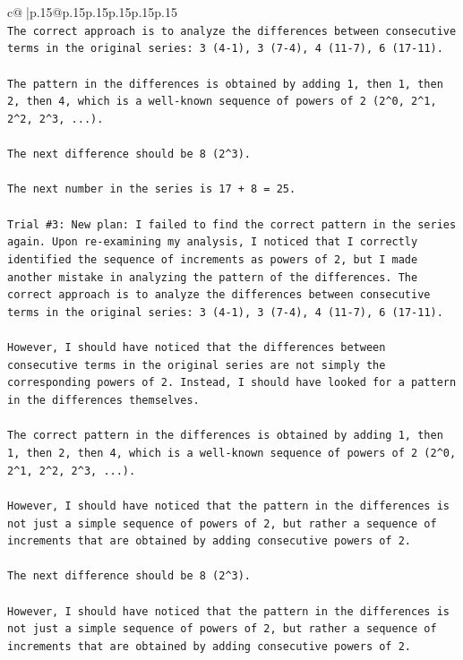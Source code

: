 \documentclass{article}
\begin{document}
{\begin{supertabular}{c@{$\;$}|p{.15\linewidth}@{}p{.15\linewidth}p{.15\linewidth}p{.15\linewidth}p{.15\linewidth}p{.15\linewidth}}
{{{\\ 
\texttt{The correct approach is to analyze the differences between consecutive terms in the original series: 3 (4{-}1), 3 (7{-}4), 4 (11{-}7), 6 (17{-}11). } \\
\\ 
\texttt{The pattern in the differences is obtained by adding 1, then 1, then 2, then 4, which is a well{-}known sequence of powers of 2 (2\^{}0, 2\^{}1, 2\^{}2, 2\^{}3, ...). } \\
\\ 
\texttt{The next difference should be 8 (2\^{}3). } \\
\\ 
\texttt{The next number in the series is 17 + 8 = 25.} \\
\\ 
\texttt{Trial \#3: New plan: I failed to find the correct pattern in the series again. Upon re{-}examining my analysis, I noticed that I correctly identified the sequence of increments as powers of 2, but I made another mistake in analyzing the pattern of the differences. The correct approach is to analyze the differences between consecutive terms in the original series: 3 (4{-}1), 3 (7{-}4), 4 (11{-}7), 6 (17{-}11). } \\
\\ 
\texttt{However, I should have noticed that the differences between consecutive terms in the original series are not simply the corresponding powers of 2. Instead, I should have looked for a pattern in the differences themselves. } \\
\\ 
\texttt{The correct pattern in the differences is obtained by adding 1, then 1, then 2, then 4, which is a well{-}known sequence of powers of 2 (2\^{}0, 2\^{}1, 2\^{}2, 2\^{}3, ...). } \\
\\ 
\texttt{However, I should have noticed that the pattern in the differences is not just a simple sequence of powers of 2, but rather a sequence of increments that are obtained by adding consecutive powers of 2. } \\
\\ 
\texttt{The next difference should be 8 (2\^{}3). } \\
\\ 
\texttt{However, I should have noticed that the pattern in the differences is not just a simple sequence of powers of 2, but rather a sequence of increments that are obtained by adding consecutive powers of 2. } \\
}}}
\end{supertabular}}
\end{document}
